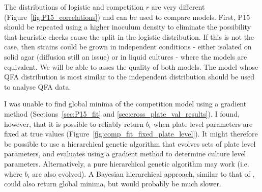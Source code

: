 The distributions of logistic and competition \(r\) are very different
(Figure~\ref{fig:P15_correlations}) and can be used to compare
models. First, P15 should be repeated using a higher inoculum density
to eliminate the possibility that heuristic checks cause the split in
the logistic distribution. If this is not the case, then strains could
be grown in independent conditions - either isolated on solid agar
(diffusion still an issue) or in liquid cultures - where the models
are equivalent. We will be able to asses the quality of both
models. The model whose QFA distribution is most similar to the
independent distribution should be used to analyse QFA data.


I was unable to find global minima of the competition model using a
gradient method (Sections~\ref{sec:P15_fit} and
\ref{sec:cross_plate_val_results}). I found, however, that it is
possible to reliably return \(b_{i}\) when plate level parameters are
fixed at true values (Figure~\ref{fig:comp_fit_fixed_plate_level}). It
might therefore be possible to use a hierarchical genetic algorithm
that evolves sets of plate level parameters, and evaluates using a
gradient method to determine culture level parameters. Alternatively,
a pure hierarchical genetic algorithm may work (i.e. where \(b_{i}\)
are also evolved). A Bayesian hierarchical approach, similar to that
of \citet{Heydari2016}, could also return global minima, but would
probably be much slower.

